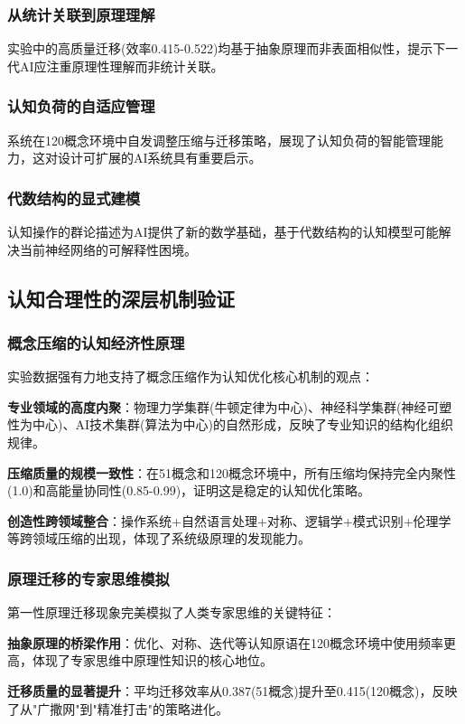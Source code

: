 \documentclass[12pt,a4paper]{article}
\begin{document}
\subsubsection{从统计关联到原理理解}
实验中的高质量迁移(效率0.415-0.522)均基于抽象原理而非表面相似性，提示下一代AI应注重原理性理解而非统计关联。

\subsubsection{认知负荷的自适应管理}
系统在120概念环境中自发调整压缩与迁移策略，展现了认知负荷的智能管理能力，这对设计可扩展的AI系统具有重要启示。

\subsubsection{代数结构的显式建模}
认知操作的群论描述为AI提供了新的数学基础，基于代数结构的认知模型可能解决当前神经网络的可解释性困境。

\subsection{认知合理性的深层机制验证}

\subsubsection{概念压缩的认知经济性原理}
实验数据强有力地支持了概念压缩作为认知优化核心机制的观点：

\textbf{专业领域的高度内聚}：物理力学集群(牛顿定律为中心)、神经科学集群(神经可塑性为中心)、AI技术集群(算法为中心)的自然形成，反映了专业知识的结构化组织规律。

\textbf{压缩质量的规模一致性}：在51概念和120概念环境中，所有压缩均保持完全内聚性(1.0)和高能量协同性(0.85-0.99)，证明这是稳定的认知优化策略。

\textbf{创造性跨领域整合}：操作系统+自然语言处理+对称、逻辑学+模式识别+伦理学等跨领域压缩的出现，体现了系统级原理的发现能力。

\subsubsection{原理迁移的专家思维模拟}
第一性原理迁移现象完美模拟了人类专家思维的关键特征：

\textbf{抽象原理的桥梁作用}：优化、对称、迭代等认知原语在120概念环境中使用频率更高，体现了专家思维中原理性知识的核心地位。

\textbf{迁移质量的显著提升}：平均迁移效率从0.387(51概念)提升至0.415(120概念)，反映了从"广撒网"到"精准打击"的策略进化。
\end{document}

